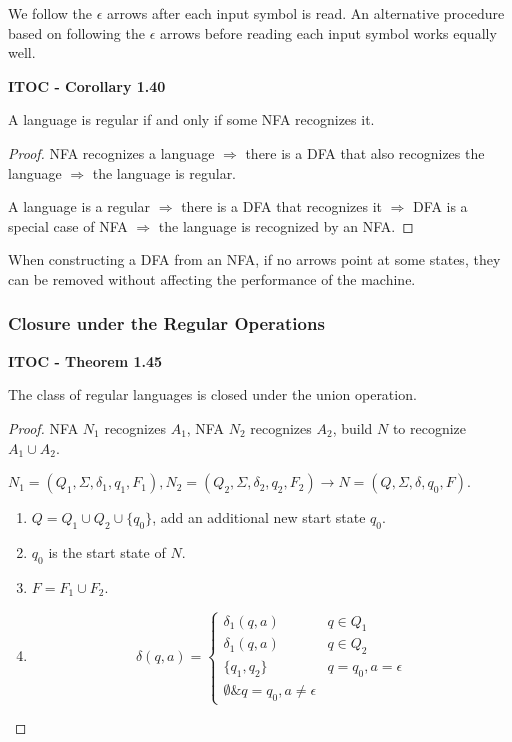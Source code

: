 {\color{blue} We follow the $\epsilon$ arrows after each input symbol is read. An alternative procedure based on following the $\epsilon$ arrows before reading each input symbol works equally well.}

\begin{shaded}
\textbf{ITOC - Corollary 1.40}

\medskip
A language is regular if and only if some NFA recognizes it.
\end{shaded}

\begin{mdframed}
\begin{proof}
NFA recognizes a language $\Rightarrow$ there is a DFA that also recognizes the language $\Rightarrow$ the language is regular.

A language is a regular $\Rightarrow$ there is a DFA that recognizes it $\Rightarrow$ DFA is a special case of NFA $\Rightarrow$ the language is recognized by an NFA.
\end{proof}
\end{mdframed}

When constructing a DFA from an NFA, if no arrows point at some states, they can be removed without affecting the performance of the machine.

\subsubsection{Closure under the Regular Operations}

\begin{shaded}
\textbf{ITOC - Theorem 1.45}

\medskip
The class of regular languages is closed under the union operation.
\end{shaded}

\begin{mdframed}
\begin{proof}
NFA $N_1$ recognizes $A_1$, NFA $N_2$ recognizes $A_2$, build $N$ to recognize $A_1 \cup A_2$.

$N_1 = (Q_1, \Sigma, \delta_1, q_1, F_1 ), N_2 = (Q_2, \Sigma, \delta_2, q_2, F_2) \rightarrow N = (Q, \Sigma, \delta, q_0, F)$.
\begin{enumerate}
\item $Q = 	Q_1 \cup Q_2 \cup \{q_0\}$, add an additional new start state $q_0$.

\item $q_0$ is the start state of $N$.

\item $F = F_1 \cup F_2$.

\item 
\[
\delta(q, a) = \begin{cases}
\delta_1(q, a) 	&q \in Q_1 \\
\delta_1(q, a) 	&q \in Q_2 \\
\{q_1, q_2\}	&q = q_0, a = \epsilon \\
\emptyset 		 \&q = q_0, a \neq \epsilon
\end{cases}
\]
\end{enumerate}
\end{proof}
\end{mdframed}

